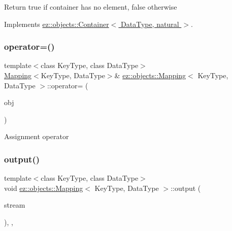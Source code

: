 Return true if container has no element, false otherwise 

Implements \hyperlink{classez_1_1objects_1_1Container_a205eb4f8a4fe967d425fdf04e5db5f93}{ez\+::objects\+::\+Container$<$ Data\+Type, natural $>$}.

\mbox{\label{classez_1_1objects_1_1Mapping_a62fd1fa4b2087fc0deaafa92aaba1c0b}} 
\subsubsection{\texorpdfstring{operator=()}{operator=()}}
{\footnotesize\ttfamily template$<$class Key\+Type, class Data\+Type$>$ \\
\hyperlink{classez_1_1objects_1_1Mapping}{Mapping}$<$Key\+Type, Data\+Type$>$\& \hyperlink{classez_1_1objects_1_1Mapping}{ez\+::objects\+::\+Mapping}$<$ Key\+Type, Data\+Type $>$\+::operator= (\begin{DoxyParamCaption}\item[{const \hyperlink{classez_1_1objects_1_1Mapping}{Mapping}$<$ Key\+Type, Data\+Type $>$ \&}]{obj }\end{DoxyParamCaption})\hspace{0.3cm}{\ttfamily [inline]}}

Assignment operator \mbox{\label{classez_1_1objects_1_1Mapping_a1233daf5c8f5d7ad9539e9d7f58703c3}} 
\subsubsection{\texorpdfstring{output()}{output()}}
{\footnotesize\ttfamily template$<$class Key\+Type, class Data\+Type$>$ \\
void \hyperlink{classez_1_1objects_1_1Mapping}{ez\+::objects\+::\+Mapping}$<$ Key\+Type, Data\+Type $>$\+::output (\begin{DoxyParamCaption}\item[{std\+::ostream \&}]{stream }\end{DoxyParamCaption})\hspace{0.3cm}{\ttfamily [inline]}, {\ttfamily [override]}, {\ttfamily [virtual]}}

